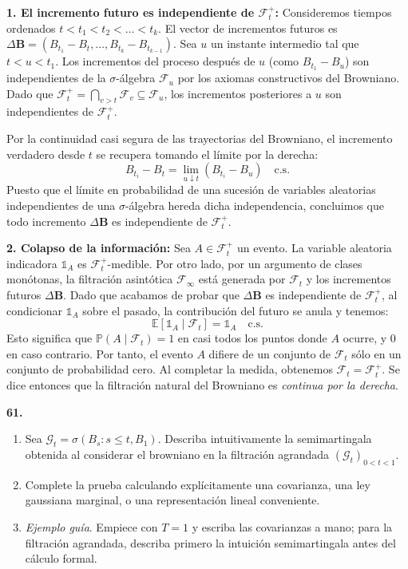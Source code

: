 \documentclass[11pt, letterpaper]{article}
\begin{document}
\begin{solucion}
    \textbf{1. El incremento futuro es independiente de $\mathcal{F}_t^+$:}
    Consideremos tiempos ordenados $t < t_1 < t_2 < \dots < t_k$. El vector de incrementos futuros es $\Delta \mathbf{B} = (B_{t_1} - B_t, \dots, B_{t_k} - B_{t_{k-1}})$.
    Sea $u$ un instante intermedio tal que $t < u < t_1$. Los incrementos del proceso después de $u$ (como $B_{t_1} - B_u$) son independientes de la $\sigma$-álgebra $\mathcal{F}_u$ por los axiomas constructivos del Browniano.
    Dado que $\mathcal{F}_t^+ = \bigcap_{v>t} \mathcal{F}_v \subseteq \mathcal{F}_u$, los incrementos posteriores a $u$ son independientes de $\mathcal{F}_t^+$.
    
    Por la continuidad casi segura de las trayectorias del Browniano, el incremento verdadero desde $t$ se recupera tomando el límite por la derecha:
    \[ B_{t_i} - B_t = \lim_{u \downarrow t} (B_{t_i} - B_u) \quad \text{c.s.} \]
    Puesto que el límite en probabilidad de una sucesión de variables aleatorias independientes de una $\sigma$-álgebra hereda dicha independencia, concluimos que todo incremento $\Delta \mathbf{B}$ es independiente de $\mathcal{F}_t^+$.

    \textbf{2. Colapso de la información:}
    Sea $A \in \mathcal{F}_t^+$ un evento. La variable aleatoria indicadora $\mathbb{1}_A$ es $\mathcal{F}_t^+$-medible.
    Por otro lado, por un argumento de clases monótonas, la filtración asintótica $\mathcal{F}_\infty$ está generada por $\mathcal{F}_t$ y los incrementos futuros $\Delta \mathbf{B}$.
    Dado que acabamos de probar que $\Delta \mathbf{B}$ es independiente de $\mathcal{F}_t^+$, al condicionar $\mathbb{1}_A$ sobre el pasado, la contribución del futuro se anula y tenemos:
    \[ \mathbb{E}[\mathbb{1}_A \mid \mathcal{F}_t] = \mathbb{1}_A \quad \text{c.s.} \]
    Esto significa que $\mathbb{P}(A \mid \mathcal{F}_t) = 1$ en casi todos los puntos donde $A$ ocurre, y $0$ en caso contrario. Por tanto, el evento $A$ difiere de un conjunto de $\mathcal{F}_t$ sólo en un conjunto de probabilidad cero. Al completar la medida, obtenemos $\mathcal{F}_t = \mathcal{F}_t^+$. Se dice entonces que la filtración natural del Browniano es \textit{continua por la derecha}.
\end{solucion}

\newpage

\begin{ejercicio}
    \textbf{61.} 
    \begin{enumerate}
        \item Sea $\mathcal{G}_{t}=\sigma(B_{s}:s\le t,B_{1})$. Describa intuitivamente la semimartingala obtenida al considerar el browniano en la filtración agrandada $(\mathcal{G}_{t})_{0<t<1}$.
        \item Complete la prueba calculando explícitamente una covarianza, una ley gaussiana marginal, o una representación lineal conveniente.
        \item \textit{Ejemplo guía}. Empiece con $T=1$ y escriba las covarianzas a mano; para la filtración agrandada, describa primero la intuición semimartingala antes del cálculo formal.
    \end{enumerate}
\end{ejercicio}
\end{document}
